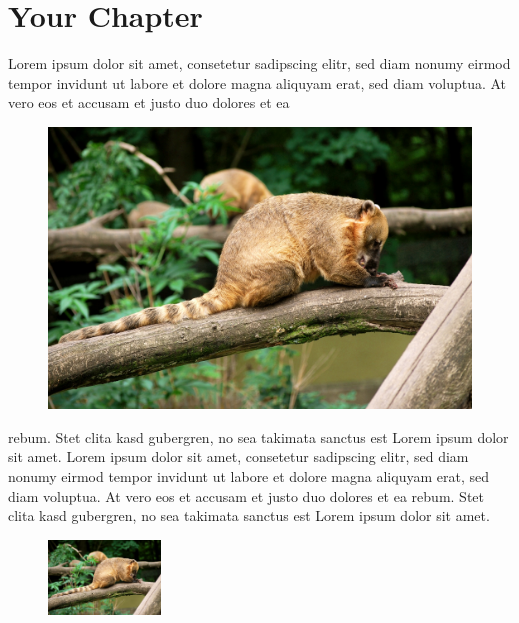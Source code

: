 \documentclass[a4paper]{scrreprt}
\begin{document}
\chapter{Your Chapter}
Lorem ipsum dolor sit amet, consetetur sadipscing elitr, sed diam 
nonumy eirmod tempor invidunt ut labore et dolore magna aliquyam 
erat, sed diam voluptua. At vero eos et accusam et justo duo dolores 
et ea 
\begin{figure}[h]
    \centering
    \includegraphics*[width=\linewidth]{YourImage.jpg} 
\end{figure}
rebum. Stet clita kasd gubergren, no sea takimata sanctus est Lorem 
ipsum dolor sit amet. Lorem ipsum dolor sit amet, consetetur 
sadipscing elitr, sed diam nonumy eirmod tempor invidunt ut labore et
dolore magna aliquyam erat, sed diam voluptua. At vero eos et accusam
et justo duo dolores et ea rebum. Stet clita kasd gubergren, no sea 
takimata sanctus est Lorem ipsum dolor sit amet.
\begin{figure}[h]
    \centering
    \includegraphics*[width=3cm]{YourImage.jpg} 
\end{figure}
\end{document}
